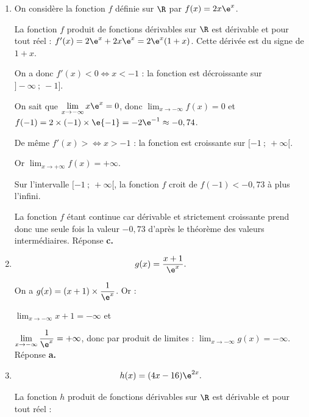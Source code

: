 \medskip






\begin{enumerate}
\item On considère la fonction $f$ définie sur $\R$ par $f(x) = 2x\e^x$.


La fonction $f$ produit de fonctions dérivables sur $\R$ est dérivable et pour tout réel : $f'(x) = 2\e^x + 2x\e^x = 2\e^x(1 + x)$. Cette dérivée est du signe de $1 + x$.

On a donc $f'(x) < 0 \iff x < - 1$ : la fonction est décroissante sur $]- \infty~;~- 1]$.

On sait que $\displaystyle\lim_{x \to -\infty} x\e^x = 0$, donc $\displaystyle\lim_{x \to -\infty}f(x) = 0$ et $f(-1) = 2 \times (- 1) \times \e{-1} = - 2\e^{-1} \approx - 0,74$.

De même $f'(x) >  \iff x > - 1$ : la fonction est croissante sur $[- 1~;~+ \infty[$.

Or  $\displaystyle\lim_{x \to +\infty}f(x) = + \infty$.

Sur l'intervalle $[- 1~;~+ \infty[$, la fonction $f$ croit de $f(-1) < -0,73$ à plus l'infini.

La fonction $f$ étant continue car dérivable et strictement croissante prend donc une seule fois la valeur $-0,73$ d'après le théorème des valeurs intermédiaires. Réponse \textbf{c.}






\item 
\[g(x) = \dfrac{x+ 1}{\e^x}.\]








On a $g(x) = (x + 1) \times \dfrac{1}{\e^x}$. Or :

$\displaystyle\lim_{x \to -\infty}x + 1= - \infty$ et 

$\displaystyle\lim_{x \to -\infty}\dfrac{1}{\e^x} = + \infty$, donc par produit de limites : $\displaystyle\lim_{x \to -\infty}g(x) = - \infty$. Réponse \textbf{a.}

\item 
\[h(x) = (4x - 16)\e^{2x}.\]













La fonction $h$ produit de fonctions dérivables sur $\R$ est dérivable et pour tout réel :


\end{enumerate}
